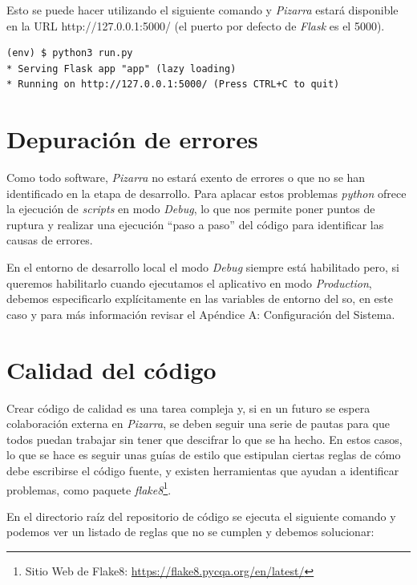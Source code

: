 \documentclass[11pt,spanish,listoffigures,listoftables]{tfgetsinf}
\begin{document}
Esto se puede hacer utilizando el siguiente comando y \textit{Pizarra} estará disponible en la URL http://127.0.0.1:5000/ (el puerto por defecto de \textit{Flask} es el 5000). \newline

\begin{lstlisting}[style=ascii-tree]
(env) $ python3 run.py 
* Serving Flask app "app" (lazy loading)
* Running on http://127.0.0.1:5000/ (Press CTRL+C to quit)
\end{lstlisting}

\section{Depuración de errores}

Como todo software, \textit{Pizarra} no estará exento de errores o  que no se han identificado en la etapa de desarrollo. Para aplacar estos problemas \textit{python} ofrece la ejecución de \textit{scripts} en modo \textit{Debug}, lo que nos permite poner puntos de ruptura y realizar una ejecución ``paso a paso'' del código para identificar las causas de errores.

En el entorno de desarrollo local el modo \textit{Debug} siempre está habilitado pero, si queremos habilitarlo cuando ejecutamos el aplicativo en modo \textit{Production}, debemos especificarlo explícitamente en las variables de entorno del \acrshort{so}, en este caso y para más información revisar el Apéndice A: Configuración del Sistema.

\section{Calidad del código}

Crear código de calidad es una tarea compleja y, si en un futuro se espera colaboración externa en \textit{Pizarra}, se deben seguir una serie de pautas para que todos puedan trabajar sin tener que descifrar lo que se ha hecho. En estos casos, lo que se hace es seguir unas guías de estilo que estipulan ciertas reglas de cómo debe escribirse el código fuente, y existen herramientas que ayudan a identificar problemas, como \Gls{paquete} \textit{flake8}\footnote{Sitio Web de Flake8: \url{https://flake8.pycqa.org/en/latest/}}.

En el directorio raíz del repositorio de código se ejecuta el siguiente comando y podemos ver un listado de reglas que no se cumplen y debemos solucionar:\newline
\end{document}
